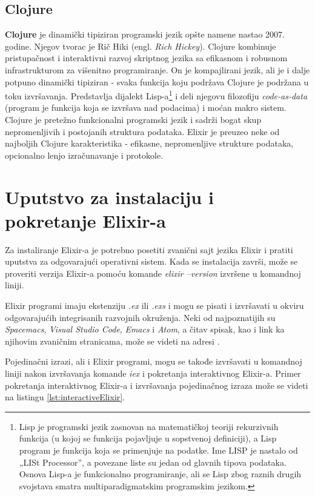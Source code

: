 \documentclass[12pt,oneside]{memoir}
\begin{document}
\subsection{Clojure}
\textbf{Clojure} je dinamički tipiziran programski jezik opšte namene nastao 2007. godine. Njegov tvorac je Rič Hiki (engl. \textit{Rich Hickey}). Clojure kombinuje pristupačnost i interaktivni razvoj skriptnog jezika sa efikasnom i robusnom infrastrukturom za višenitno programiranje. On je kompajlirani jezik, ali je i dalje potpuno dinamički tipiziran - svaka funkcija koju podržava Clojure je podržana u toku izvršavanja. Predstavlja dijalekt Lisp-a\footnote{Lisp je programski jezik  zasnovan na matematičkoj teoriji rekurzivnih funkcija
(u kojoj se funkcija pojavljuje u sopstvenoj definiciji), a Lisp program je funkcija
koja se primenjuje na podatke. Ime
LISP je nastalo od „LISt Processor”, a povezane liste su jedan od glavnih tipova
podataka. Osnova Lisp-a je funkcionalno programiranje, ali se Lisp zbog raznih drugih svojstava smatra multiparadigmatskim programskim jezikom.} i deli njegovu filozofiju \textit{code-as-data} (program je funkcija koja se izvršava nad podacima) i moćan makro sistem. Clojure je pretežno funkcionalni programski jezik i sadrži bogat skup nepromenljivih i postojanih struktura podataka. Elixir je preuzeo neke od najboljih Clojure karakteristika - efikasne, nepromenljive strukture podataka, opcionalno lenjo izračunavanje i protokole.


\section{Uputstvo za instalaciju i pokretanje Elixir-a}
\label{odeljak:Instalacija}

Za instaliranje Elixir-a je potrebno posetiti zvanični sajt jezika Elixir \cite{Elixir} i pratiti uputstva za odgovarajući operativni sistem. Kada se instalacija završi, može se proveriti verzija Elixir-a pomoću komande \textit{elixir --version} izvršene u komandnoj liniji.

Elixir programi imaju ekstenziju \textit{.ex} ili \textit{.exs} i mogu se pisati i izvršavati u okviru odgovarajućih integrisanih razvojnih okruženja. Neki od najpoznatijih su \textit{Spacemacs}, \textit{Visual Studio Code}, \textit{Emacs} i \textit{Atom}, a čitav spisak, kao i link ka njihovim zvaničnim stranicama, može se videti na adresi \cite{ElixirEditors}.

Pojedinačni izrazi, ali i Elixir programi, mogu se takođe izvršavati u komandnoj liniji nakon izvršavanja komande \textit{iex} i pokretanja interaktivnog Elixir-a. Primer pokretanja interaktivnog Elixir-a i izvršavanja pojedinačnog izraza može se videti na listingu \ref{lst:interactiveElixir}.
\end{document}
